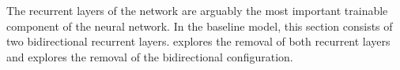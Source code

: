 
The recurrent layers of the network are arguably the most
important trainable component of the neural network. In the
baseline model, this section consists of two bidirectional
recurrent layers. 
explores the removal of both recurrent layers and
 explores the removal of the
bidirectional configuration. 
